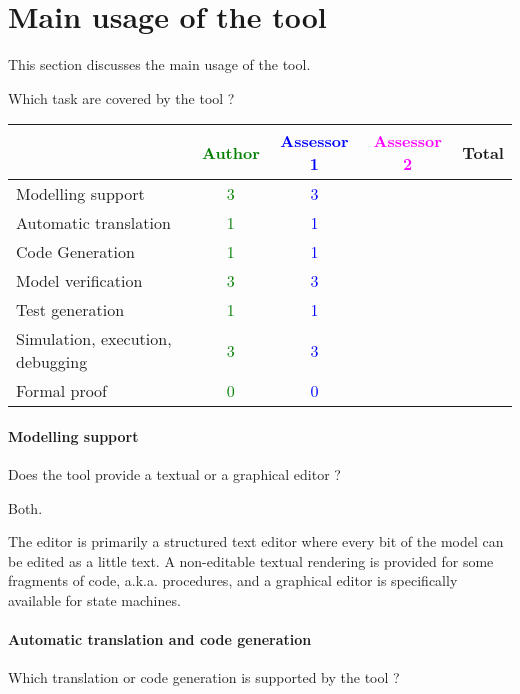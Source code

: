 \section{Main usage of the tool}
\label{main_usage}

This section discusses the main usage of the tool.

Which task are covered by the tool ?

\begin{tabular}{|l | c | c | c | c|}
\hline
& \textcolor{green}{Author} & \textcolor{blue}{Assessor 1} & \textcolor{magenta}{Assessor 2} & Total \\
\hline 
Modelling support & \textcolor{green}{3} & \textcolor{blue}{3} & &  \\
\hline
Automatic translation  & \textcolor{green}{1} & \textcolor{blue}{1} & & \\
\hline
Code Generation  & \textcolor{green}{1} & \textcolor{blue}{1} & & \\
\hline
Model verification & \textcolor{green}{3} & \textcolor{blue}{3} & & \\
\hline
Test generation & \textcolor{green}{1} & \textcolor{blue}{1} & & \\
\hline
Simulation, execution, debugging & \textcolor{green}{3} & \textcolor{blue}{3} & & \\
\hline
Formal proof & \textcolor{green}{0} & \textcolor{blue}{0} & & \\
\hline
\end{tabular}

\paragraph{Modelling support}
Does the tool provide a  textual or a graphical editor ?

\begin{author_comment}
Both.
\end{author_comment}

\begin{assessor1}
The editor is primarily a structured text editor where every bit of the model can be edited as a little text. 
A non-editable textual rendering is provided for some fragments of code, a.k.a. procedures, and a graphical editor is specifically available for state machines. 
\end{assessor1}

\paragraph{Automatic translation and code generation}
Which translation or code generation is supported by the tool ?

